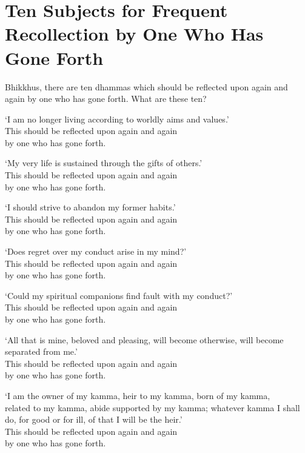 
\section[Ten Subjects for Frequent Recollection]{Ten Subjects for Frequent Recollection by One Who Has Gone Forth}


Bhikkhus, there are ten dhammas which should be reflected upon again and again by one who has gone forth. What are these ten?

`I am no longer living according to worldly aims and values.'\\
This should be reflected upon again and again\\
by one who has gone forth.

`My very life is sustained through the gifts of others.'\\
This should be reflected upon again and again\\
by one who has gone forth.

`I should strive to abandon my former habits.'\\
This should be reflected upon again and again\\
by one who has gone forth.

`Does regret over my conduct arise in my mind?'\\
This should be reflected upon again and again\\
by one who has gone forth.

`Could my spiritual companions find fault with my conduct?'\\
This should be reflected upon again and again\\
by one who has gone forth.

`All that is mine, beloved and pleasing, will become otherwise, will become separated from me.'\\
This should be reflected upon again and again\\
by one who has gone forth.

`I am the owner of my kamma, heir to my kamma, born of my kamma,\\
related to my kamma, abide supported by my kamma; whatever kamma I shall do, for good or for ill, of that I will be the heir.'\\
This should be reflected upon again and again\\
by one who has gone forth.

